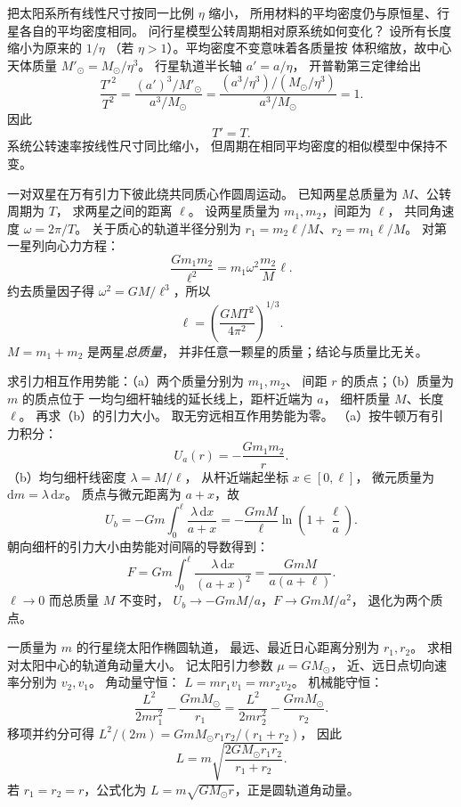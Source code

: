 把太阳系所有线性尺寸按同一比例 $\eta$ 缩小，
所用材料的平均密度仍与原恒星、行星各自的平均密度相同。
问行星模型公转周期相对原系统如何变化？
\exsolution
设所有长度缩小为原来的 $1/\eta$
（若 $\eta>1$）。平均密度不变意味着各质量按
体积缩放，故中心天体质量
$M'_\odot=M_\odot/\eta^3$。
行星轨道半长轴 $a'=a/\eta$，
开普勒第三定律给出
\[
\frac{{T'}^2}{T^2}
=\frac{(a')^3/M'_\odot}{a^3/M_\odot}
=\frac{(a^3/\eta^3)/(M_\odot/\eta^3)}
{a^3/M_\odot}=1.
\]
因此
\[
\boxed{T'=T}.
\]
\excheck 系统公转速率按线性尺寸同比缩小，
但周期在相同平均密度的相似模型中保持不变。

一对双星在万有引力下彼此绕共同质心作圆周运动。
已知两星总质量为 $M$、公转周期为 $T$，
求两星之间的距离 $\ell$。
\exsolution
设两星质量为 $m_1,m_2$，间距为 $\ell$，
共同角速度 $\omega=2\pi/T$。
关于质心的轨道半径分别为
$r_1=m_2\ell/M$、$r_2=m_1\ell/M$。
对第一星列向心力方程：
\[
\frac{Gm_1m_2}{\ell^2}
=m_1\omega^2\frac{m_2}{M}\ell.
\]
约去质量因子得
$\omega^2=GM/\ell^3$，所以
\[
\boxed{\ell=\left(\frac{GMT^2}{4\pi^2}\right)^{1/3}}.
\]
\excheck $M=m_1+m_2$ 是两星\emph{总质量}，
并非任意一颗星的质量；结论与质量比无关。

求引力相互作用势能：（a）两个质量分别为 $m_1,m_2$、
间距 $r$ 的质点；（b）质量为 $m$ 的质点位于
一均匀细杆轴线的延长线上，距杆近端为 $a$，
细杆质量 $M$、长度 $\ell$。
再求（b）的引力大小。
\exsolution
取无穷远相互作用势能为零。
（a）按牛顿万有引力积分：
\[
\boxed{U_a(r)=-\frac{Gm_1m_2}{r}}.
\]
（b）均匀细杆线密度 $\lambda=M/\ell$，
从杆近端起坐标 $x\in[0,\ell]$，
微元质量为 $\mathrm dm=\lambda\,\mathrm dx$。
质点与微元距离为 $a+x$，故
\[
U_b=-Gm\int_0^\ell\frac{\lambda\,\mathrm dx}{a+x}
=\boxed{-\frac{GmM}{\ell}
\ln\left(1+\frac{\ell}{a}\right)}.
\]
朝向细杆的引力大小由势能对间隔的导数得到：
\[
\boxed{F=Gm\int_0^\ell
\frac{\lambda\,\mathrm dx}{(a+x)^2}
=\frac{GmM}{a(a+\ell)}}.
\]
\excheck $\ell\to0$ 而总质量 $M$ 不变时，
$U_b\to-GmM/a$，$F\to GmM/a^2$，
退化为两个质点。

一质量为 $m$ 的行星绕太阳作椭圆轨道，
最远、最近日心距离分别为 $r_1,r_2$。
求相对太阳中心的轨道角动量大小。
\exsolution
记太阳引力参数 $\mu=GM_\odot$，
近、远日点切向速率分别为 $v_2,v_1$。
角动量守恒：
$L=mr_1v_1=mr_2v_2$。
机械能守恒：
\[
\frac{L^2}{2mr_1^2}-\frac{GmM_\odot}{r_1}
=\frac{L^2}{2mr_2^2}-\frac{GmM_\odot}{r_2}.
\]
移项并约分可得
$L^2/(2m)=GmM_\odot r_1r_2/(r_1+r_2)$，
因此
\[
\boxed{L=m\sqrt{\frac{2GM_\odot r_1r_2}{r_1+r_2}}}.
\]
\excheck 若 $r_1=r_2=r$，公式化为
$L=m\sqrt{GM_\odot r}$，正是圆轨道角动量。

